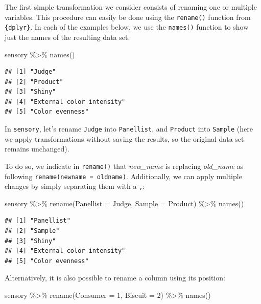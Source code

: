\documentclass[
]{krantz}
\makeatletter
\newenvironment{Shaded}{\begin{snugshade}}{\end{snugshade}}
\newcommand{\AttributeTok}[1]{\textcolor[rgb]{0.61,0.61,0.61}{#1}}
\newcommand{\DecValTok}[1]{\textcolor[rgb]{0.06,0.06,0.06}{#1}}
\newcommand{\FunctionTok}[1]{\textcolor[rgb]{0,0,0}{#1}}
\newcommand{\NormalTok}[1]{#1}
\newcommand{\SpecialCharTok}[1]{\textcolor[rgb]{0,0,0}{#1}}
\newenvironment{kframe}{%
\medskip{}
\setlength{\fboxsep}{.8em}
 \def\at@end@of@kframe{}%
 \ifinner\ifhmode%
  \def\at@end@of@kframe{\end{minipage}}%
  \begin{minipage}{\columnwidth}%
 \fi\fi%
 \def\FrameCommand##1{\hskip\@totalleftmargin \hskip-\fboxsep
 \colorbox{shadecolor}{##1}\hskip-\fboxsep
     \hskip-\linewidth \hskip-\@totalleftmargin \hskip\columnwidth}%
 \MakeFramed {\advance\hsize-\width
   \@totalleftmargin\z@ \linewidth\hsize
   \@setminipage}}%
 {\par\unskip\endMakeFramed%
 \at@end@of@kframe}
\renewenvironment{Shaded}{\begin{kframe}}{\end{kframe}}
\makeatother
\begin{document}
The first simple transformation we consider consists of renaming one or multiple variables. This procedure can easily be done using the \texttt{rename()} function from \texttt{\{dplyr\}}. In each of the examples below, we use the \texttt{names()} function to show just the names of the resulting data set.

\begin{Shaded}
\begin{Highlighting}[]
\NormalTok{sensory }\SpecialCharTok{\%\textgreater{}\%}
  \FunctionTok{names}\NormalTok{()}
\end{Highlighting}
\end{Shaded}

\begin{verbatim}
## [1] "Judge"                   
## [2] "Product"                 
## [3] "Shiny"                   
## [4] "External color intensity"
## [5] "Color evenness"
\end{verbatim}

In \texttt{sensory}, let's rename \texttt{Judge} into \texttt{Panellist}, and \texttt{Product} into \texttt{Sample} (here we apply transformations without saving the results, so the original data set remains unchanged).

To do so, we indicate in \texttt{rename()} that \emph{new\_name} is replacing \emph{old\_name} as following \texttt{rename(newname\ =\ oldname)}. Additionally, we can apply multiple changes by simply separating them with a \texttt{,}:

\begin{Shaded}
\begin{Highlighting}[]
\NormalTok{sensory }\SpecialCharTok{\%\textgreater{}\%}
  \FunctionTok{rename}\NormalTok{(}\AttributeTok{Panellist =}\NormalTok{ Judge, }\AttributeTok{Sample =}\NormalTok{ Product) }\SpecialCharTok{\%\textgreater{}\%}
  \FunctionTok{names}\NormalTok{()}
\end{Highlighting}
\end{Shaded}

\begin{verbatim}
## [1] "Panellist"               
## [2] "Sample"                  
## [3] "Shiny"                   
## [4] "External color intensity"
## [5] "Color evenness"
\end{verbatim}

Alternatively, it is also possible to rename a column using its position:

\begin{Shaded}
\begin{Highlighting}[]
\NormalTok{sensory }\SpecialCharTok{\%\textgreater{}\%}
  \FunctionTok{rename}\NormalTok{(}\AttributeTok{Consumer =} \DecValTok{1}\NormalTok{, }\AttributeTok{Biscuit =} \DecValTok{2}\NormalTok{) }\SpecialCharTok{\%\textgreater{}\%}
  \FunctionTok{names}\NormalTok{()}
\end{Highlighting}
\end{Shaded}
\end{document}
